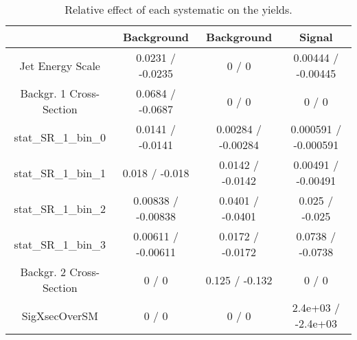 \documentclass[10pt]{article}
\begin{document}
\begin{table}[htbp]
\begin{center}
\begin{tabular}{|c|c|c|c|}
\hline 
      & Background      & Background      & Signal \\ 
\hline 
  Jet Energy Scale & 0.0231 / -0.0235 & 0 / 0 & 0.00444 / -0.00445 \\ 
  Backgr. 1 Cross-Section & 0.0684 / -0.0687 & 0 / 0 & 0 / 0 \\ 
 stat_SR_1_bin_0 & 0.0141 / -0.0141 & 0.00284 / -0.00284 & 0.000591 / -0.000591 \\ 
 stat_SR_1_bin_1 & 0.018 / -0.018 & 0.0142 / -0.0142 & 0.00491 / -0.00491 \\ 
 stat_SR_1_bin_2 & 0.00838 / -0.00838 & 0.0401 / -0.0401 & 0.025 / -0.025 \\ 
 stat_SR_1_bin_3 & 0.00611 / -0.00611 & 0.0172 / -0.0172 & 0.0738 / -0.0738 \\ 
  Backgr. 2 Cross-Section & 0 / 0 & 0.125 / -0.132 & 0 / 0 \\ 
 SigXsecOverSM & 0 / 0 & 0 / 0 & 2.4e+03 / -2.4e+03 \\ 
\hline 
\end{tabular} 
\caption{Relative effect of each systematic on the yields.} 
\end{center} 
\end{table} 
\end{document}
